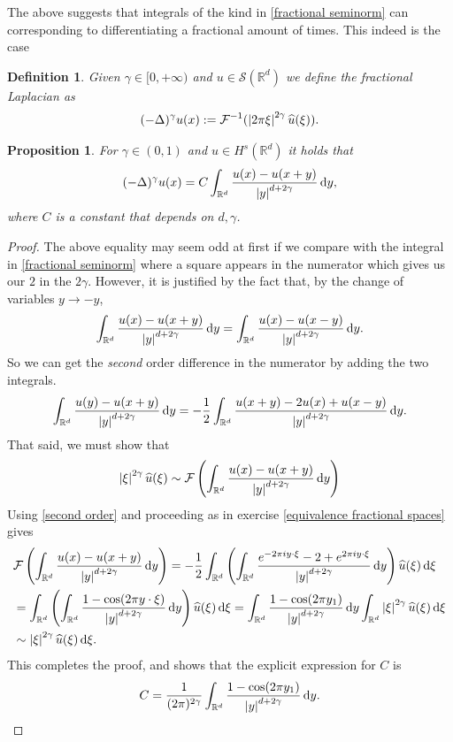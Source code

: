 \documentclass[
    a4paper,
    DIV=14,
    abstract=true,
    numbers=noenddot
]
{scrartcl}
\newtheorem{proposition}[theorem]{Proposition}
\newtheorem{definition}[theorem]{Definition}
\theoremstyle{definition}
\newcommand{\wh}[1]{\widehat{#1}}
\renewcommand{\d}{\,\mathrm{d}}\newcommand{\dx}{\,\mathrm{d}x}
\newcommand{\R}{\mathbb{R}}
\newcommand{\Ff}{\mathcal{F}}
\newcommand{\Ss}{\mathcal{S}}
\begin{document}
The above suggests that integrals of the kind in \eqref{fractional seminorm} can corresponding to differentiating a fractional amount of times. This indeed is the case
\begin{definition}
	Given $\gamma  \in [0,+\infty)$ and $u \in \Ss (\R^d)$ we define the fractional Laplacian as
	\begin{align*}
		(-\Delta )^{\gamma }u(x):= \mathcal{F}^{-1}(\abs{2\pi\xi}^{2\gamma }\wh{u}(\xi )).
	\end{align*}
\end{definition}
\begin{proposition}
	For $\gamma  \in (0,1)$ and $u \in H^s(\R^d)$ it holds that
	\begin{align*}
		(-\Delta )^{\gamma }u(x)=C\int_{\R^d}\frac{u(x)-u(x+y)}{\abs{y}^{d+2\gamma}}\d y,
	\end{align*}
	where $C$ is a constant that depends on $d,\gamma $.
\end{proposition}
\begin{proof}
	The above equality may seem odd at first if we compare with the integral in \eqref{fractional seminorm} where a square appears in the numerator which gives us our $2$  in the $2 \gamma $. However, it is justified by the fact that, by the change of variables $y \to -y$,
	\begin{align*}
		\int_{\R^d}\frac{u(x)-u(x+y)}{\abs{y}^{d+2\gamma}}\d y=\int_{\R^d}\frac{u(x)-u(x-y)}{\abs{y}^{d+2\gamma}}\d y.
	\end{align*}
	So we can get the \emph{second} order difference in the numerator by adding the two integrals.
	\begin{align}\label{second order}
		\int_{\R^d}\frac{u(y)-u(x+y)}{\abs{y}^{d+2\gamma}}\d y=-\frac{1}{2}\int_{\R^d}\frac{u(x+y)-2u(x)+u(x-y)}{\abs{y}^{d+2\gamma}}\d y.
	\end{align}
	That said, we must show that
	\begin{align*}
		\abs{\xi}^{2\gamma }\wh{u}(\xi )\sim \Ff \left(\int_{\R^d}\frac{u(x)-u(x+y)}{\abs{y}^{d+2\gamma}}\d y\right)
	\end{align*}
	Using \eqref{second order} and proceeding as in exercise \ref{equivalence fractional spaces} gives
	\begin{align*}
		 & \Ff \left(\int_{\R^d}\frac{u(x)-u(x+y)}{\abs{y}^{d+2\gamma}}\d y\right)= -\frac{1}{2} \int_{\R^d}\left(\int_{\R^d}\frac{e^{-2\pi i y \cdot \xi}-2+e^{2\pi i y \cdot \xi}}{\abs{y}^{d+2\gamma}}\d y\right) \wh{u}(\xi)\d \xi       \\
		 & =\int_{\R^d}\left(\int_{\R^d}\frac{1-\cos(2\pi y \cdot \xi)}{\abs{y}^{d+2\gamma}}\d y\right) \wh{u}(\xi)\d \xi =\int_{\R^d}  \frac{1-\cos(2\pi  y_1) }{\abs{y}^{d+2\gamma	}}\d y\int_{\R^d}\abs{\xi}^{2 \gamma }\wh{u}(\xi)\d \xi \\& \sim \abs{\xi}^{2 \gamma }\wh{u}(\xi)\d \xi.
	\end{align*}
	This completes the proof, and shows that the explicit expression for $C$ is
	\begin{align*}
		C=\frac{1}{(2\pi)^{2 \gamma }}\int_{\R^d}  \frac{1-\cos(2\pi  y_1) }{\abs{y}^{d+2\gamma	}}\d y.
	\end{align*}
\end{proof}
\end{document}
